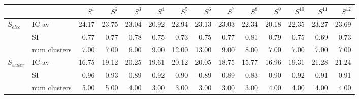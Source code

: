 \begin{tabular}{llrrrrrrrrrrrr}
\toprule
 &  & $S^{1}$ & $S^{2}$ & $S^{3}$ & $S^{4}$ & $S^{5}$ & $S^{6}$ & $S^{7}$ & $S^{8}$ & $S^{9}$ & $S^{10}$ & $S^{11}$ & $S^{12}$ \\
\midrule
\multirow[c]{3}{*}{$S_{elec}$} & IC-av & 24.17 & 23.75 & 23.04 & 20.92 & 22.94 & 23.13 & 23.03 & 22.34 & 20.18 & 22.35 & 23.27 & 23.69 \\
 & SI & 0.77 & 0.77 & 0.78 & 0.75 & 0.73 & 0.75 & 0.77 & 0.81 & 0.79 & 0.75 & 0.69 & 0.73 \\
 & num clusters & 7.00 & 7.00 & 6.00 & 9.00 & 12.00 & 13.00 & 9.00 & 8.00 & 7.00 & 7.00 & 7.00 & 7.00 \\
\multirow[c]{3}{*}{$S_{water}$} & IC-av & 16.75 & 19.12 & 20.25 & 19.61 & 20.12 & 20.05 & 18.75 & 15.77 & 16.96 & 19.31 & 21.28 & 21.24 \\
 & SI & 0.96 & 0.93 & 0.89 & 0.92 & 0.90 & 0.89 & 0.89 & 0.83 & 0.90 & 0.92 & 0.91 & 0.91 \\
 & num clusters & 5.00 & 5.00 & 4.00 & 3.00 & 3.00 & 3.00 & 3.00 & 3.00 & 4.00 & 4.00 & 4.00 & 4.00 \\
\bottomrule
\end{tabular}
